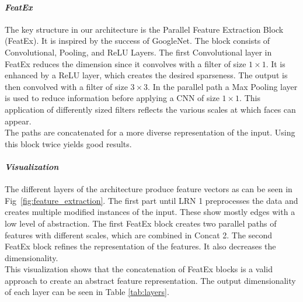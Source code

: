\paraV
\paragraph{\textit{FeatEx}}
The key structure in our architecture is the Parallel Feature Extraction Block (FeatEx). It is inspired by the success of GoogleNet. The block consists of Convolutional, Pooling, and ReLU Layers. The first Convolutional layer in FeatEx reduces the dimension since it convolves with a filter of size $1\times1$. It is enhanced by a ReLU layer, which creates the desired sparseness. The output is then convolved with a filter of size $3\times3$. In the parallel path a Max Pooling layer is used to reduce information before applying a CNN of size $1\times1$. This application of differently sized filters reflects the various scales at which faces can appear.\\
The paths are concatenated for a more diverse representation of the input. Using this block twice yields good results.\\


\paraV
\paragraph{\textit{Visualization}}
The different layers of the architecture produce feature vectors as can be seen in Fig~\ref{fig:feature_extraction}.
The first part until LRN 1 preprocesses the data and creates multiple modified instances of the input. These show mostly edges with a low level of abstraction. The first FeatEx block creates two parallel paths of features with different scales, which are combined in Concat 2. The second FeatEx block refines the representation of the features. It also decreases the dimensionality.\\
This visualization shows that the concatenation of FeatEx blocks is a valid approach to create an abstract feature representation. The output dimensionality of each layer can be seen in Table \ref{tab:layers}.


